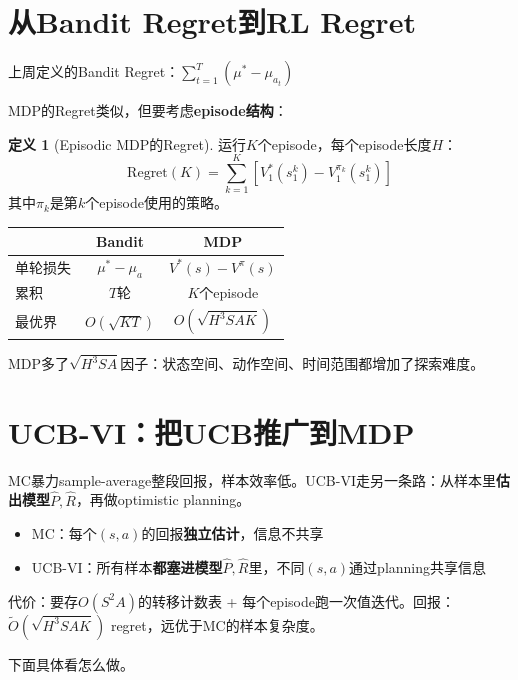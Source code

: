 \documentclass[11pt,a4paper]{article}
\theoremstyle{definition}
\newtheorem{definition}{定义}[section]
\begin{document}
\section{从Bandit Regret到RL Regret}

\begin{plainwords}[承接上周]
上周定义的Bandit Regret：$\sum_{t=1}^T (\mu^* - \mu_{a_t})$

MDP的Regret类似，但要考虑\textbf{episode结构}：
\end{plainwords}

\begin{definition}[Episodic MDP的Regret]
运行$K$个episode，每个episode长度$H$：
\[
\text{Regret}(K) = \sum_{k=1}^K \left[V_1^*(s_1^k) - V_1^{\pi_k}(s_1^k)\right]
\]
其中$\pi_k$是第$k$个episode使用的策略。
\end{definition}

\begin{keypoint}
\begin{center}
\begin{tabular}{l|c|c}
\toprule
& Bandit & MDP \\
\midrule
单轮损失 & $\mu^* - \mu_a$ & $V^*(s) - V^\pi(s)$ \\
累积 & $T$轮 & $K$个episode \\
最优界 & $O(\sqrt{KT})$ & $O(\sqrt{H^3 SAK})$ \\
\bottomrule
\end{tabular}
\end{center}

MDP多了$\sqrt{H^3 SA}$因子：状态空间、动作空间、时间范围都增加了探索难度。
\end{keypoint}

\section{UCB-VI：把UCB推广到MDP}

\begin{plainwords}[相对MC的改进点]
MC暴力sample-average整段回报，样本效率低。UCB-VI走另一条路：从样本里\textbf{估出模型}$\hat P, \hat R$，再做optimistic planning。
\begin{itemize}
\item MC：每个$(s,a)$的回报\textbf{独立估计}，信息不共享
\item UCB-VI：所有样本\textbf{都塞进模型}$\hat P, \hat R$里，不同$(s,a)$通过planning共享信息
\end{itemize}
代价：要存$O(S^2 A)$的转移计数表 + 每个episode跑一次值迭代。回报：$\tilde O(\sqrt{H^3 SAK})$ regret，远优于MC的样本复杂度。

下面具体看怎么做。
\end{plainwords}
\end{document}
